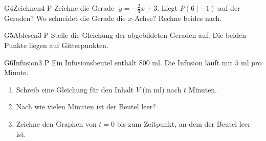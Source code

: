 \documentclass[11pt]{article}
\begin{document}
\begin{lpaufgabe}{G4}{Zeichnen}{4 P}
Zeichne die Gerade $\;y = -\tfrac{2}{3}x + 3$. Liegt $P(6 \mid -1)$ auf der Geraden? Wo schneidet die Gerade die $x$-Achse? Rechne beides nach.

\smallskip
\begin{minipage}[t]{0.55\linewidth}\vspace{0pt}
\end{minipage}\hfill
\begin{minipage}[t]{0.42\linewidth}\vspace{0pt}
\end{minipage}
\end{lpaufgabe}

\begin{lpaufgabe}{G5}{Ablesen}{3 P}
Stelle die Gleichung der abgebildeten Geraden auf. Die beiden Punkte liegen auf Gitterpunkten.

\smallskip
\begin{minipage}[t]{0.45\linewidth}\vspace{0pt}
\end{minipage}\hfill
\begin{minipage}[t]{0.52\linewidth}\vspace{0pt}
\end{minipage}
\end{lpaufgabe}


\begin{lpaufgabe}{G6}{Infusion}{3 P}
Ein Infusionsbeutel enthält $800$ ml. Die Infusion läuft mit $5$ ml pro Minute.
\begin{enumerate}[label=(\alph*),leftmargin=*,itemsep=3pt]
\item Schreib eine Gleichung für den Inhalt $V$ (in ml) nach $t$ Minuten.
\item Nach wie vielen Minuten ist der Beutel leer?
\item Zeichne den Graphen von $t = 0$ bis zum Zeitpunkt, an dem der Beutel leer ist.
\end{enumerate}

\smallskip
\begin{minipage}[t]{0.5\linewidth}\vspace{0pt}
\end{minipage}\hfill
\begin{minipage}[t]{0.47\linewidth}\vspace{0pt}
\end{minipage}
\end{lpaufgabe}
\end{document}
